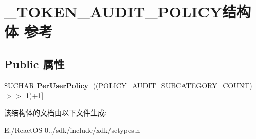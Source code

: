 \hypertarget{struct___t_o_k_e_n___a_u_d_i_t___p_o_l_i_c_y}{}\section{\+\_\+\+T\+O\+K\+E\+N\+\_\+\+A\+U\+D\+I\+T\+\_\+\+P\+O\+L\+I\+C\+Y结构体 参考}
\label{struct___t_o_k_e_n___a_u_d_i_t___p_o_l_i_c_y}
\subsection*{Public 属性}
\begin{DoxyCompactItemize}
\item 
\mbox{\label{struct___t_o_k_e_n___a_u_d_i_t___p_o_l_i_c_y_acbb96436c8797f81bf12f9b274e9981e}} 
\$U\+C\+H\+AR {\bfseries Per\+User\+Policy} \mbox{[}((P\+O\+L\+I\+C\+Y\+\_\+\+A\+U\+D\+I\+T\+\_\+\+S\+U\+B\+C\+A\+T\+E\+G\+O\+R\+Y\+\_\+\+C\+O\+U\+NT) $>$$>$ 1)+1\mbox{]}
\end{DoxyCompactItemize}


该结构体的文档由以下文件生成\+:\begin{DoxyCompactItemize}
\item 
E\+:/\+React\+O\+S-\/0../sdk/include/xdk/setypes.\+h\end{DoxyCompactItemize}
